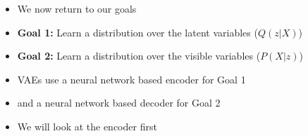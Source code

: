 \begin{frame}
	\begin{columns}
		\begin{overlayarea}{\textwidth}{\textheight}
			\vspace{3pt}
			
		\end{overlayarea}
		\begin{overlayarea}{\textwidth}{\textheight}
			\begin{itemize}\justifying
				\item<1-> We now return to our goals
				\item<2-> \textbf{Goal 1:} Learn a distribution over the latent variables ($Q(z|X)$)
				\item<3-> \textbf{Goal 2:} Learn a distribution over the visible variables ($P(X|z)$)
				\item<4-> VAEs use a neural network based encoder for Goal 1
				\item<5-> and a neural network based decoder for Goal 2
				\item<6-> We will look at the encoder first
			\end{itemize}
		\end{overlayarea}
	\end{columns}
\end{frame}


